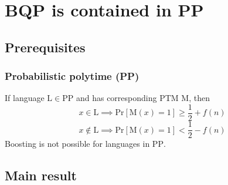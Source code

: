 \documentclass[../main.tex]{subfiles}
\begin{document}
\section{BQP is contained in PP}

\subsection{Prerequisites}

\subsubsection{Probabilistic polytime (PP)}

\noindent If language $\mathrm{L} \in \mathrm{PP}$ and has corresponding PTM $\mathrm{M}$, then 
\begin{equation*}
    x \in \mathrm{L} \implies \mathrm{Pr}[\mathrm{M}(x) = 1] \ge \frac{1}{2} + f(n)
\end{equation*}
\begin{equation*}
    x \not\in \mathrm{L} \implies \mathrm{Pr}[\mathrm{M}(x) = 1] < \frac{1}{2} - f(n)
\end{equation*}
Boosting is not possible for languages in $\mathrm{PP}$.

\subsection{Main result}
\end{document}
